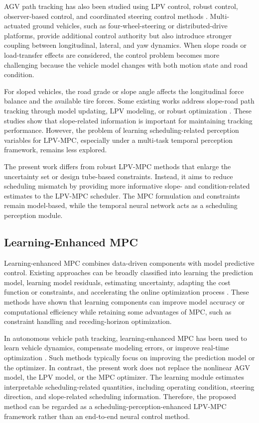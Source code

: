 \documentclass{ieeeaccess}
\newcommand{\citep}[1]{\cite{#1}}
\begin{document}
AGV path tracking has also been studied using LPV control, robust control, observer-based control, and coordinated steering control methods \citep{}. Multi-actuated ground vehicles, such as four-wheel-steering or distributed-drive platforms, provide additional control authority but also introduce stronger coupling between longitudinal, lateral, and yaw dynamics. When slope roads or load-transfer effects are considered, the control problem becomes more challenging because the vehicle model changes with both motion state and road condition.



For sloped vehicles, the road grade or slope angle affects the longitudinal force balance and the available tire forces. Some existing works address slope-road path tracking through model updating, LPV modeling, or robust optimization \citep{}. These studies show that slope-related information is important for maintaining tracking performance. However, the problem of learning scheduling-related perception variables for LPV-MPC, especially under a multi-task temporal perception framework, remains less explored.



The present work differs from robust LPV-MPC methods that enlarge the uncertainty set or design tube-based constraints. Instead, it aims to reduce scheduling mismatch by providing more informative slope- and condition-related estimates to the LPV-MPC scheduler. The MPC formulation and constraints remain model-based, while the temporal neural network acts as a scheduling perception module.



\subsection{Learning-Enhanced MPC}



Learning-enhanced MPC combines data-driven components with model predictive control. Existing approaches can be broadly classified into learning the prediction model, learning model residuals, estimating uncertainty, adapting the cost function or constraints, and accelerating the online optimization process \citep{}. These methods have shown that learning components can improve model accuracy or computational efficiency while retaining some advantages of MPC, such as constraint handling and receding-horizon optimization.



In autonomous vehicle path tracking, learning-enhanced MPC has been used to learn vehicle dynamics, compensate modeling errors, or improve real-time optimization \citep{}. Such methods typically focus on improving the prediction model or the optimizer. In contrast, the present work does not replace the nonlinear AGV model, the LPV model, or the MPC optimizer. The learning module estimates interpretable scheduling-related quantities, including operating condition, steering direction, and slope-related scheduling information. Therefore, the proposed method can be regarded as a scheduling-perception-enhanced LPV-MPC framework rather than an end-to-end neural control method.
\end{document}
